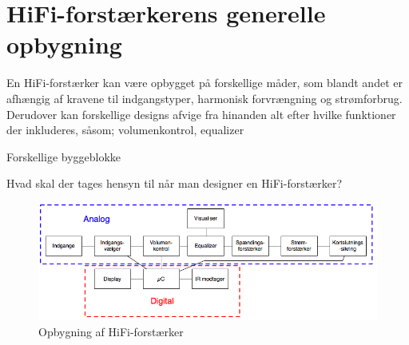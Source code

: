 \section{HiFi-forstærkerens generelle opbygning}

En HiFi-forstærker kan være opbygget på forskellige måder, som blandt andet er afhængig af kravene til indgangstyper, harmonisk forvrængning og strømforbrug. Derudover kan forskellige designs afvige fra hinanden alt efter hvilke funktioner der inkluderes, såsom; volumenkontrol, equalizer

Forskellige byggeblokke

Hvad skal der tages hensyn til når man designer en HiFi-forstærker?



\begin{figure}[h]
\centering
\includegraphics[scale=.6]{indledende_analyse/generel_effektforstaerker/forstaerker_opbygning.png}
\caption{Opbygning af HiFi-forstærker}
\label{}
\end{figure}